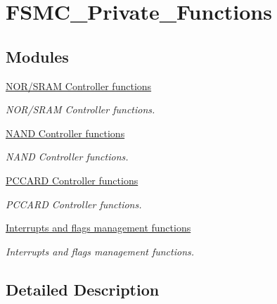 \hypertarget{group___f_s_m_c___private___functions}{}\section{F\+S\+M\+C\+\_\+\+Private\+\_\+\+Functions}
\label{group___f_s_m_c___private___functions}
\subsection*{Modules}
\begin{DoxyCompactItemize}
\item 
\hyperlink{group___f_s_m_c___group1}{N\+O\+R/\+S\+R\+A\+M Controller functions}
\begin{DoxyCompactList}\small\item\em N\+O\+R/\+S\+R\+A\+M Controller functions. \end{DoxyCompactList}\item 
\hyperlink{group___f_s_m_c___group2}{N\+A\+N\+D Controller functions}
\begin{DoxyCompactList}\small\item\em N\+A\+N\+D Controller functions. \end{DoxyCompactList}\item 
\hyperlink{group___f_s_m_c___group3}{P\+C\+C\+A\+R\+D Controller functions}
\begin{DoxyCompactList}\small\item\em P\+C\+C\+A\+R\+D Controller functions. \end{DoxyCompactList}\item 
\hyperlink{group___f_s_m_c___group4}{Interrupts and flags management functions}
\begin{DoxyCompactList}\small\item\em Interrupts and flags management functions. \end{DoxyCompactList}\end{DoxyCompactItemize}


\subsection{Detailed Description}

